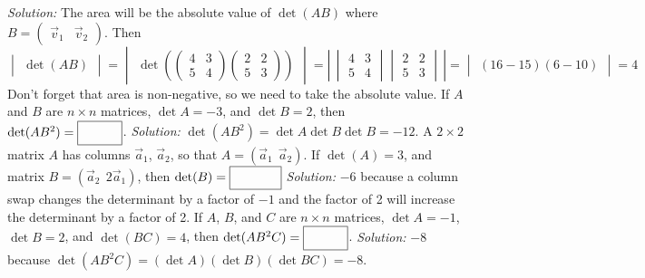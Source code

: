 \begin{parts}
        \ifnum {} {\color{DarkBlue} \textit{Solution:} The area will be the absolute value of $\det \left(AB \right)$ where $B=\begin{pmatrix} \vec v_1 & \vec v_2\end{pmatrix}$. Then $$
        \begin{vmatrix} \det \left( AB \right) \end{vmatrix}
        = \begin{vmatrix} \det \left(\begin{pmatrix} 4&3\\5&4\end{pmatrix}\begin{pmatrix} 2&2 \\5&3\end{pmatrix} \right) \end{vmatrix}
        = \left| \, \begin{vmatrix} 4&3\\5&4\end{vmatrix}\begin{vmatrix} 2&2 \\5&3\end{vmatrix}\, \right|
        = \begin{vmatrix} (16-15)(6-10)\end{vmatrix}
        = 4$$ Don't forget that area is non-negative, so we need to take the absolute value.} 
        \fi    
    \fi 
    \ifnum {}
        If $A$ and $B$ are $n\times n$ matrices, $\det A = -3$, and $\det B= 2$, then $\det(AB^2) = \framebox{\strut\hspace{1cm}}$.
        \ifnum {} {\color{DarkBlue} \textit{Solution:} $\det(AB^2) = \det A \det B \det B = -12$. } \fi    
    \fi 
    \ifnum {}
        A $2\times 2$ matrix $A$ has columns $\vec a_1$, $\vec a_2$, so that $A = (\vec a_1 \ \ \vec a_2)$. If $\det(A) = 3$, and matrix $B = (\vec a_2 \ \ 2\vec a_1)$, then $\det(B) = \framebox{\strut\hspace{1.2cm}}$
        \ifnum {} {\color{DarkBlue} \textit{Solution:} $-6$ because a column swap changes the determinant by a factor of $-1$ and the factor of 2 will increase the determinant by a factor of 2.  } \fi    
    \fi 
    \ifnum {}
        If $A$, $B$, and $C$ are $n\times n$ matrices, $\det A = -1$, $\det B = 2$, and $\det(BC) = 4$, then $\det(AB^2C) = \framebox{\strut\hspace{1cm}}$.
        \ifnum {} {\color{DarkBlue} \textit{Solution:} $-8$ because $\det(AB^2C) = (\det A) (\det B) (\det BC) = - 8$. } \fi    

\end{parts}
